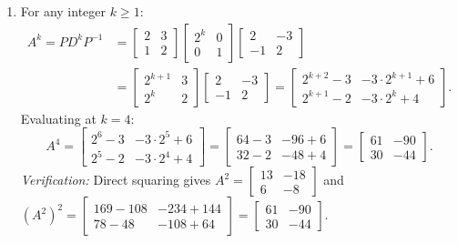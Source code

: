 \documentclass[11pt, letterpaper]{article}
\theoremstyle{definition}
\theoremstyle{remark}
\begin{document}
\begin{enumerate}[label=(\alph*), topsep=3pt, itemsep=4pt]
    Setting $P = \begin{bmatrix} 2 & 3 \\ 1 & 2 \end{bmatrix}$ and $D = \begin{bmatrix} 2 & 0 \\ 0 & 1 \end{bmatrix}$, we have $\det(P) = 4 - 3 = 1$, so $P^{-1} = \begin{bmatrix} 2 & -3 \\ -1 & 2 \end{bmatrix}$ and $A = PDP^{-1}$.
    \item For any integer $k \ge 1$:
    \begin{align*}
    A^k = PD^kP^{-1} &= \begin{bmatrix} 2 & 3 \\ 1 & 2 \end{bmatrix}\begin{bmatrix} 2^k & 0 \\ 0 & 1 \end{bmatrix}\begin{bmatrix} 2 & -3 \\ -1 & 2 \end{bmatrix} \\
    &= \begin{bmatrix} 2^{k+1} & 3 \\ 2^k & 2 \end{bmatrix}\begin{bmatrix} 2 & -3 \\ -1 & 2 \end{bmatrix} = \begin{bmatrix} 2^{k+2} - 3 & -3 \cdot 2^{k+1} + 6 \\ 2^{k+1} - 2 & -3 \cdot 2^k + 4 \end{bmatrix}.
    \end{align*}
    Evaluating at $k = 4$:
    \[
    A^4 = \begin{bmatrix} 2^6 - 3 & -3 \cdot 2^5 + 6 \\ 2^5 - 2 & -3 \cdot 2^4 + 4 \end{bmatrix} = \begin{bmatrix} 64 - 3 & -96 + 6 \\ 32 - 2 & -48 + 4 \end{bmatrix} = \begin{bmatrix} 61 & -90 \\ 30 & -44 \end{bmatrix}.
    \]
    \textit{Verification:} Direct squaring gives $A^2 = \begin{bmatrix} 13 & -18 \\ 6 & -8 \end{bmatrix}$ and $(A^2)^2 = \begin{bmatrix} 169 - 108 & -234 + 144 \\ 78 - 48 & -108 + 64 \end{bmatrix} = \begin{bmatrix} 61 & -90 \\ 30 & -44 \end{bmatrix}$.
\end{enumerate}
\end{document}
